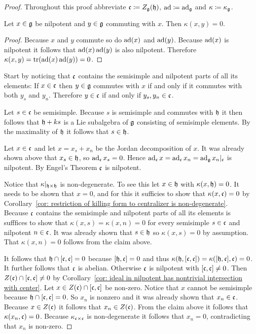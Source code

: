 \begin{proof}
 Throughout this proof abbreviate $\mathfrak{c} \coloneqq Z_{\mathfrak{g}}(\mathfrak{h})$, $\operatorname{ad} \coloneqq \operatorname{ad}_{\mathfrak{g}}$ and $\kappa \coloneqq \kappa_{\mathfrak{g}}$.

 \begin{claim*}\label{claim: technical and traceless}
  Let $x \in \mathfrak{g}$ be nilpotent and $y \in \mathfrak{g}$ commuting with $x$. Then $\kappa(x,y) = 0$.
 \end{claim*}
 \begin{proof}
  Because $x$ and $y$ commute so do $\operatorname{ad}(x)$ and $\operatorname{ad}(y)$. Because $\operatorname{ad}(x)$ is nilpotent it follows that $\operatorname{ad}(x)\operatorname{ad}(y)$ is also nilpotent. Therefore $\kappa(x,y) = \operatorname{tr}(\operatorname{ad}(x)\operatorname{ad}(y)) = 0$.
 \end{proof}
 
 Start by noticing that $\mathfrak{c}$ contains the semisimple and nilpotent parts of all its elements: If $x \in \mathfrak{c}$ then $y \in \mathfrak{g}$ commutes with $x$ if and only if it commutes with both $y_s$ and $y_n$. Therefore $y \in \mathfrak{c}$ if and only if $y_s, y_n \in \mathfrak{c}$.
 
 Let $s \in \mathfrak{c}$ be semisimple. Because $s$ is semisimple and commutes with $\mathfrak{h}$ it then follows that $\mathfrak{h} + ks$ is a Lie subalgebra of $\mathfrak{g}$ consisting of semisimple elements. By the maximality of $\mathfrak{h}$ it follows that $s \in \mathfrak{h}$.
 
 Let $x \in \mathfrak{c}$ and let $x = x_s + x_n$ be the Jordan decomposition of $x$. It was already shown above that $x_s \in \mathfrak{h}$, so $\operatorname{ad}_{\mathfrak{c}} x_s = 0$. Hence $\operatorname{ad}_{\mathfrak{c}} x = \operatorname{ad}_{\mathfrak{c}} x_n = \operatorname{ad}_{\mathfrak{g}} x_n|_{\mathfrak{c}}$ is nilpotent. By Engel’s Theorem $\mathfrak{c}$ is nilpotent.
 
 Notice that $\kappa|_{\mathfrak{h} \times \mathfrak{h}}$ is non-degenerate. To see this let $x \in \mathfrak{h}$ with $\kappa(x, \mathfrak{h}) = 0$. It needs to be shown that $x = 0$, and for this it sufficies to show that $\kappa(x, \mathfrak{c}) = 0$ by Corollary~\ref{cor: restriction of killing form to centralizer is non-degenerate}. Because $\mathfrak{c}$ contains the semisimple and nilpotent parts of all its elements is sufffices to show that $\kappa(x,s) = \kappa(x,n) = 0$ for every semisimple $s \in \mathfrak{c}$ and nilpotent $n \in \mathfrak{c}$. It was already shown that $s \in \mathfrak{h}$ so $\kappa(x,s) = 0$ by assumption. That $\kappa(x,n) = 0$ follows from the claim above.
 
 It follows that $\mathfrak{h} \cap [\mathfrak{c},\mathfrak{c}] = 0$ because $[\mathfrak{h},\mathfrak{c}] = 0$ and thus $\kappa(\mathfrak{h}, [\mathfrak{c},\mathfrak{c}]) = \kappa([\mathfrak{h}, \mathfrak{c}], \mathfrak{c}) = 0$. It further follows that $\mathfrak{c}$ is abelian. Otherwise $\mathfrak{c}$ is nilpotent with $[\mathfrak{c}, \mathfrak{c}] \neq 0$. Then $Z(\mathfrak{c}) \cap [\mathfrak{c},\mathfrak{c}] \neq 0$ by Corollary~\ref{cor: ideal in nilpotent has nontrivial intersection with center}. Let $x \in Z(\mathfrak{c}) \cap [\mathfrak{c},\mathfrak{c}]$ be non-zero. Notice that $x$ cannot be semisimple because $\mathfrak{h} \cap [\mathfrak{c},\mathfrak{c}] = 0$. So $x_n$ is nonzero and it was already shown that $x_n \in \mathfrak{c}$. Because $x \in Z(\mathfrak{c})$ it follows that $x_n \in Z(\mathfrak{c})$. From the claim above it follows that $\kappa(x_n, \mathfrak{c}) = 0$. Because $\kappa_{\mathfrak{c} \times \mathfrak{c}}$ is non-degenerate it follows that $x_n = 0$, contradicting that $x_n$ is non-zero.
 

\end{proof}

